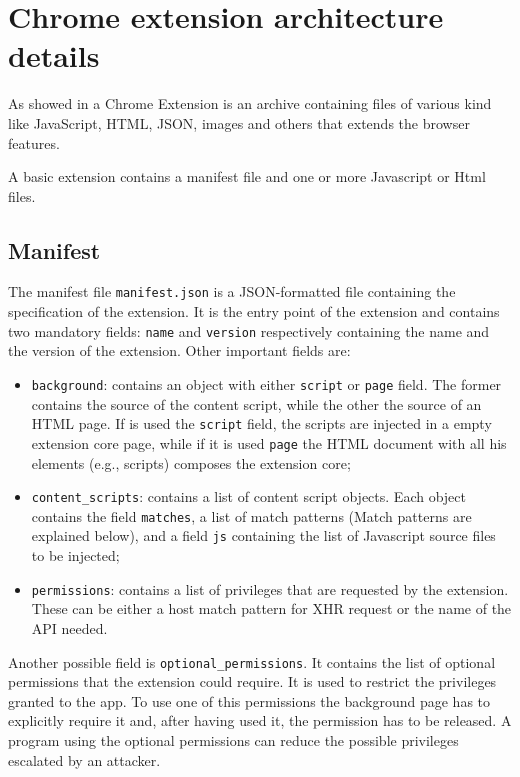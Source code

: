 \section{Chrome extension architecture details}
\label{sec:ExtDetails}
As showed in \cite{ChromeExtensionOnline} a Chrome Extension is an archive containing files of various kind like JavaScript, HTML, JSON, images and others that extends the browser features.

A basic extension contains a manifest file and one or more Javascript or Html files.

\subsection{Manifest}
The manifest file \texttt{manifest.json} is a JSON-formatted file containing the specification of the extension. It is the entry point of the extension and contains two mandatory fields: \texttt{name} and \texttt{version} respectively containing the name and the version of the extension. Other important fields are:
\begin{itemize}
\item \texttt{background}: contains an object with either \texttt{script} or \texttt{page} field. The former contains the source of the content script, while the other the source of an HTML page. If is used the \texttt{script} field, the scripts are injected in a empty extension core page, while if it is used \texttt{page} the HTML document with all his elements (e.g., scripts) composes the extension core;
\item \texttt{content\_scripts}: contains a list of content script objects. Each object contains the field \texttt{matches}, a list of match patterns (Match patterns are explained below), and a field \texttt{js} containing the list of Javascript source files to be injected;
\item \texttt{permissions}: contains a list of privileges that are requested by the extension. These can be either a host match pattern for XHR request or the name of the API needed.
\end{itemize}

Another possible field is \texttt{optional\_permissions}. It contains the list of optional permissions that the extension could require. It is used to restrict the privileges granted to the app. To use one of this permissions the background page has to explicitly require it and, after having used it, the permission has to be released. A program using the optional permissions can reduce the possible privileges escalated by an attacker.

